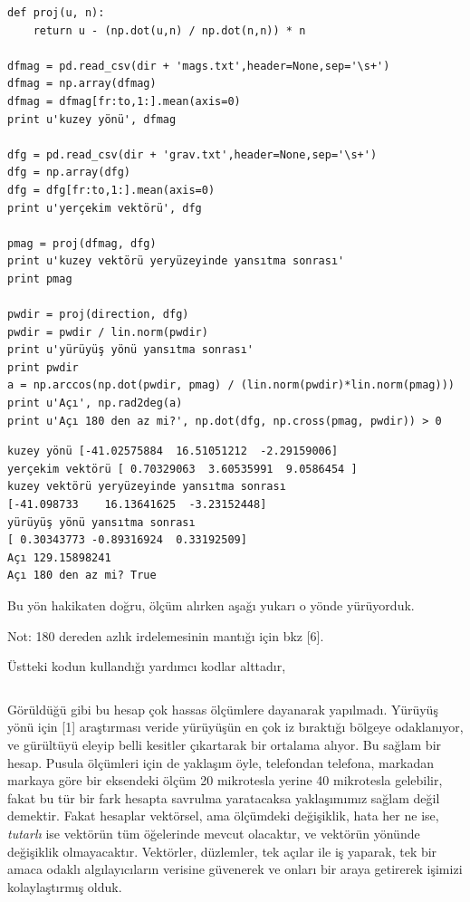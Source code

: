\documentclass[12pt,fleqn]{article}\usepackage{../../common}
\begin{document}
\begin{verbatim}
def proj(u, n):
    return u - (np.dot(u,n) / np.dot(n,n)) * n

dfmag = pd.read_csv(dir + 'mags.txt',header=None,sep='\s+')
dfmag = np.array(dfmag)
dfmag = dfmag[fr:to,1:].mean(axis=0)
print u'kuzey yönü', dfmag

dfg = pd.read_csv(dir + 'grav.txt',header=None,sep='\s+')
dfg = np.array(dfg)
dfg = dfg[fr:to,1:].mean(axis=0)
print u'yerçekim vektörü', dfg

pmag = proj(dfmag, dfg)
print u'kuzey vektörü yeryüzeyinde yansıtma sonrası'
print pmag

pwdir = proj(direction, dfg)
pwdir = pwdir / lin.norm(pwdir)
print u'yürüyüş yönü yansıtma sonrası'
print pwdir
a = np.arccos(np.dot(pwdir, pmag) / (lin.norm(pwdir)*lin.norm(pmag)))
print u'Açı', np.rad2deg(a)
print u'Açı 180 den az mi?', np.dot(dfg, np.cross(pmag, pwdir)) > 0
\end{verbatim}

\begin{verbatim}
kuzey yönü [-41.02575884  16.51051212  -2.29159006]
yerçekim vektörü [ 0.70329063  3.60535991  9.0586454 ]
kuzey vektörü yeryüzeyinde yansıtma sonrası
[-41.098733    16.13641625  -3.23152448]
yürüyüş yönü yansıtma sonrası
[ 0.30343773 -0.89316924  0.33192509]
Açı 129.15898241
Açı 180 den az mi? True
\end{verbatim}

Bu yön hakikaten doğru, ölçüm alırken aşağı yukarı o yönde yürüyorduk. 

Not: 180 dereden azlık irdelemesinin mantığı için bkz [6].

Üstteki kodun kullandığı yardımcı kodlar alttadır,

\inputminted[fontsize=\footnotesize]{python}{health.py}

Görüldüğü gibi bu hesap çok hassas ölçümlere dayanarak yapılmadı. Yürüyüş
yönü için [1] araştırması veride yürüyüşün en çok iz bıraktığı bölgeye
odaklanıyor, ve gürültüyü eleyip belli kesitler çıkartarak bir ortalama
alıyor. Bu sağlam bir hesap. Pusula ölçümleri için de yaklaşım öyle,
telefondan telefona, markadan markaya göre bir eksendeki ölçüm 20
mikrotesla yerine 40 mikrotesla gelebilir, fakat bu tür bir fark hesapta
savrulma yaratacaksa yaklaşımımız sağlam değil demektir. Fakat hesaplar
vektörsel, ama ölçümdeki değişiklik, hata her ne ise, {\em tutarlı} ise
vektörün tüm öğelerinde mevcut olacaktır, ve vektörün yönünde değişiklik
olmayacaktır. Vektörler, düzlemler, tek açılar ile iş yaparak, tek bir
amaca odaklı algılayıcıların verisine güvenerek ve onları bir araya
getirerek işimizi kolaylaştırmış olduk.
\end{document}
